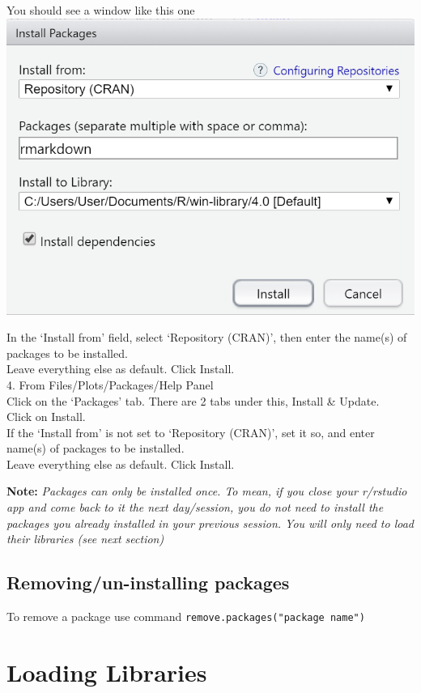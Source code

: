 \documentclass[
]{book}
\begin{document}
You should see a window like this one \includegraphics{tutorial_screenshots/install_rmkdn_toolstab.png}

In the `Install from' field, select `Repository (CRAN)', then enter the name(s) of packages to be installed.\\
Leave everything else as default. Click Install.\\
4. From Files/Plots/Packages/Help Panel\\
Click on the `Packages' tab. There are 2 tabs under this, Install \& Update.\\
Click on Install.\\
If the `Install from' is not set to `Repository (CRAN)', set it so, and enter name(s) of packages to be installed.\\
Leave everything else as default. Click Install.

\textbf{Note:} \emph{Packages can only be installed once. To mean, if you close your r/rstudio app and come back to it the next day/session, you do not need to install the packages you already installed in your previous session. You will only need to load their libraries (see next section)}

\hypertarget{removingun-installing-packages}{%
\subsection{Removing/un-installing packages}\label{removingun-installing-packages}}

To remove a package use command \texttt{remove.packages("package\ name")}

\hypertarget{loading-libraries}{%
\section{Loading Libraries}\label{loading-libraries}}
\end{document}
